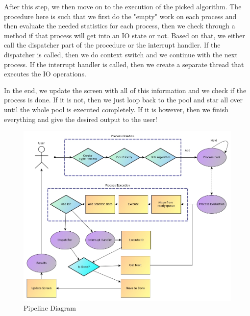 \documentclass{article}
\begin{document}
After this step, we then move on to the execution of the picked algorithm. The procedure here is such that we first do the "empty" work on each process and then evaluate the needed statistics for each process, then we check through a method if that process will get into an IO state or not. Based on that, we either call the dispatcher part of the procedure or the interrupt handler. If the dispatcher is called, then we do context switch and we continue with the next process. If the interrupt handler is called, then we create a separate thread that executes the IO operations.

In the end, we update the screen with all of this information and we check if the process is done. If it is not, then we just loop back to the pool and star all over until the whole pool is executed completely. If it is however, then we finish everything and give the desired output to the user!

\begin{figure}[H]
  \includegraphics[width=\linewidth]{./pics/pipeline.jpg}
  \caption{Pipeline Diagram}
  \label{fig:Pipeline Diagram}
\end{figure}
\end{document}

